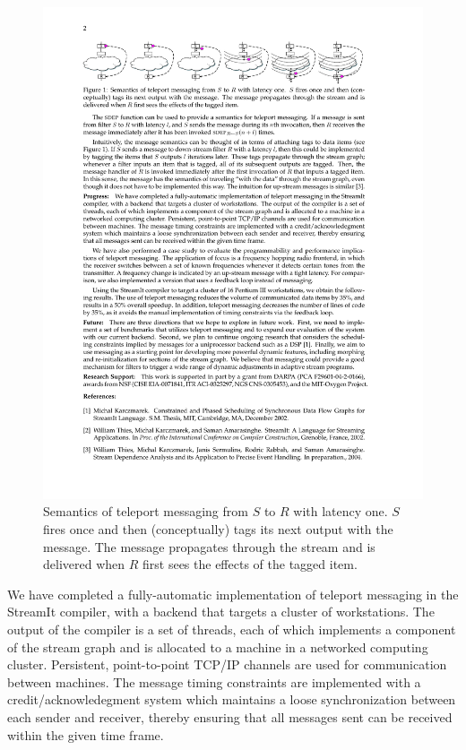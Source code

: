 \documentclass{csailabstractbook}
\begin{document}
\begin{figure}[t]
  \begin{center}
    \includegraphics[width=6.25in]{thies1-2.pdf}
  \end{center}
  \vspace{-15pt}
  \caption{Semantics of teleport messaging from $S$ to $R$ with
  latency one.  $S$ fires once and then (conceptually) tags its next
  output with the message.  The message propagates through the stream
  and is delivered when $R$ first sees the effects of the tagged
  item.}

  \vspace{-6pt}
\end{figure}


We have completed a fully-automatic implementation of teleport
messaging in the StreamIt compiler, with a backend that targets a
cluster of workstations.  The output of the compiler is a set of
threads, each of which implements a component of the stream graph and
is allocated to a machine in a networked computing cluster.
Persistent, point-to-point TCP/IP channels are used for communication
between machines.  The message timing constraints are implemented with
a credit/acknowledegment system which maintains a loose
synchronization between each sender and receiver, thereby ensuring
that all messages sent can be received within the given time frame.
\end{document}
